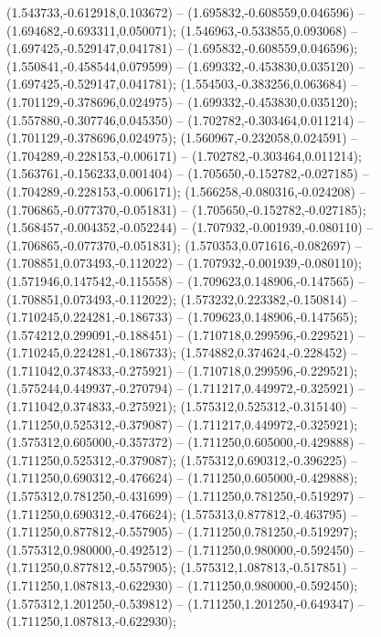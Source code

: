  (1.543733,-0.612918,0.103672) -- (1.695832,-0.608559,0.046596) -- (1.694682,-0.693311,0.050071);
 (1.546963,-0.533855,0.093068) -- (1.697425,-0.529147,0.041781) -- (1.695832,-0.608559,0.046596);
 (1.550841,-0.458544,0.079599) -- (1.699332,-0.453830,0.035120) -- (1.697425,-0.529147,0.041781);
 (1.554503,-0.383256,0.063684) -- (1.701129,-0.378696,0.024975) -- (1.699332,-0.453830,0.035120);
 (1.557880,-0.307746,0.045350) -- (1.702782,-0.303464,0.011214) -- (1.701129,-0.378696,0.024975);
 (1.560967,-0.232058,0.024591) -- (1.704289,-0.228153,-0.006171) -- (1.702782,-0.303464,0.011214);
 (1.563761,-0.156233,0.001404) -- (1.705650,-0.152782,-0.027185) -- (1.704289,-0.228153,-0.006171);
 (1.566258,-0.080316,-0.024208) -- (1.706865,-0.077370,-0.051831) -- (1.705650,-0.152782,-0.027185);
 (1.568457,-0.004352,-0.052244) -- (1.707932,-0.001939,-0.080110) -- (1.706865,-0.077370,-0.051831);
 (1.570353,0.071616,-0.082697) -- (1.708851,0.073493,-0.112022) -- (1.707932,-0.001939,-0.080110);
 (1.571946,0.147542,-0.115558) -- (1.709623,0.148906,-0.147565) -- (1.708851,0.073493,-0.112022);
 (1.573232,0.223382,-0.150814) -- (1.710245,0.224281,-0.186733) -- (1.709623,0.148906,-0.147565);
 (1.574212,0.299091,-0.188451) -- (1.710718,0.299596,-0.229521) -- (1.710245,0.224281,-0.186733);
 (1.574882,0.374624,-0.228452) -- (1.711042,0.374833,-0.275921) -- (1.710718,0.299596,-0.229521);
 (1.575244,0.449937,-0.270794) -- (1.711217,0.449972,-0.325921) -- (1.711042,0.374833,-0.275921);
 (1.575312,0.525312,-0.315140) -- (1.711250,0.525312,-0.379087) -- (1.711217,0.449972,-0.325921);
 (1.575312,0.605000,-0.357372) -- (1.711250,0.605000,-0.429888) -- (1.711250,0.525312,-0.379087);
 (1.575312,0.690312,-0.396225) -- (1.711250,0.690312,-0.476624) -- (1.711250,0.605000,-0.429888);
 (1.575312,0.781250,-0.431699) -- (1.711250,0.781250,-0.519297) -- (1.711250,0.690312,-0.476624);
 (1.575313,0.877812,-0.463795) -- (1.711250,0.877812,-0.557905) -- (1.711250,0.781250,-0.519297);
 (1.575312,0.980000,-0.492512) -- (1.711250,0.980000,-0.592450) -- (1.711250,0.877812,-0.557905);
 (1.575312,1.087813,-0.517851) -- (1.711250,1.087813,-0.622930) -- (1.711250,0.980000,-0.592450);
 (1.575312,1.201250,-0.539812) -- (1.711250,1.201250,-0.649347) -- (1.711250,1.087813,-0.622930);
